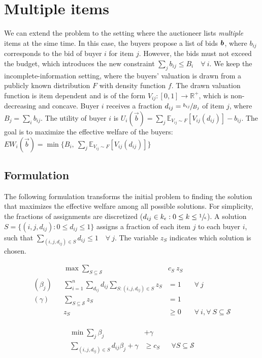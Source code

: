 \section{Multiple items}


We can extend the problem to the setting where the auctioneer lists \emph{multiple} items at the sime time. In this case, the buyers propose a list of bids $\bm{b}$, where $b_{ij}$ corresponds to the bid of buyer $i$ for item $j$. However, the bids must not exceed the budget, which introduces the new constraint $\sum_{j} b_{ij} \le B_i \quad \forall\ i$. We keep the incomplete-information setting, where the buyers' valuation is drawn from a publicly known distribution $F$ with density function $f$. The drawn valuation function is item dependent and is of the form $V_{ij} : [0,1] \rightarrow \mathbb{R}^+$, which is non-decreasing and concave. Buyer $i$ receives a fraction $d_{ij} = \sfrac{b_{ij}}{B_j}$ of item $j$, where $B_j = \sum_i b_{ij}$. The utility of buyer $i$ is $U_i(\vec{b}) = \sum_{j} \mathbb{E}_{V_{ij} \sim F}[V_{ij}(d_{ij})] - b_{ij}$. The goal is to maximize the effective welfare of the buyers: $EW_i(\vec{b}) = \min\{B_i,\  \sum_{j} \mathbb{E}_{V_{ij} \sim F}[V_{ij}(d_{ij})]\}$

\subsection{Formulation}

The following formulation transforms the initial problem to finding the solution that maximizes the effective welfare among all possible solutions. For simplicity, the fractions of assignments are discretized ($d_{ij} \in k_{\epsilon} : 0 \le k \le \sfrac{1}{\epsilon}$). A solution $S = \{(i, j, d_{ij}) : 0 \le d_{ij} \le 1\}$ assigns a fraction of each item $j$ to each buyer $i$, such that $\sum_{(i,j,d_{ij}) \in S} d_{ij} \le 1 \quad \forall\ j$. The variable $z_S$ indicates which solution is chosen.

\begin{minipage}[t]{0.59\textwidth}
	\begin{align*}
		&& \max  \sum_{S \subseteq \mathcal{S}} &c_{S}\ z_{S} \\
		(\beta_j) && \sum_{i=1}^{n} \sum_{d_{ij}} d_{ij} \sum_{S: (i,j,d_{ij}) \in S } z_{S} &= 1 & & \forall \ j\\
		(\gamma) && \sum_{S \subseteq \mathcal{S}} z_{S}  &= 1	& & \\
		&& z_{S} &\geq 0 & & \forall\ i, \forall\ S \subseteq \mathcal{S}\\
	\end{align*}
\end{minipage}
\begin{minipage}[t]{0.3\textwidth}
	\begin{align*}
		\min \sum_{j} \beta_j &+ \gamma \\
		\sum_{(i,j,d_{ij}) \in S} d_{ij} \beta_j + \gamma &\geq c_{S}  & & \forall S \subseteq \mathcal{S}\\
\end{align*}
\end{minipage}

